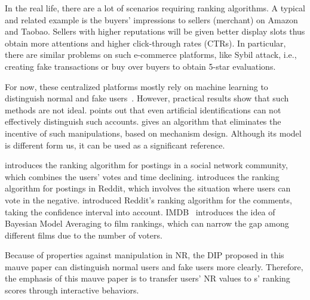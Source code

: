 In the real life, there are a lot of scenarios requiring ranking algorithms. A
typical and related example is the buyers' impressions to sellers (merchant) on
Amazon and Taobao. Sellers with higher reputations will be given better display
slots thus obtain more attentions and higher click-through rates (CTRs). In
particular, there are similar problems on such e-commerce platforms, like Sybil attack, i.e., creating fake transactions or buy over buyers to obtain 5-star evaluations.

For now, these centralized platforms mostly rely on machine learning to
distinguish normal and fake
users~\cite{mukherjee2013spotting,jindal2008opinion,yoo2009comparison}.
However, practical results show that such methods are not ideal.
\cite{ott2011finding} points out that even artificial identifications can not effectively distinguish such accounts.  \cite{cai2016mechanism} gives an
algorithm that eliminates the incentive of such manipulations, based on
mechanism design. Although its model is different form us, it can be used as a significant reference.

\cite{salihefendic2010hacker} introduces the ranking algorithm for postings in
a social network community, which combines the users' votes and time declining.
\cite{salihefendic2010reddit} introduces the ranking algorithm for postings in Reddit, which involves the situation where users can vote in the negative.
\cite{miller2009how} introduced Reddit's ranking algorithm for the comments, taking the confidence interval into account.
IMDB~\cite{IMDB} introduces the idea of Bayesian Model Averaging to film
rankings, which can narrow the gap among different films due to the number of voters.

Because of properties against manipulation in NR, the DIP proposed in this mauve paper can distinguish normal users and fake users more clearly. Therefore, the emphasis of this mauve paper is to transfer users' NR values to {\dapp}s' ranking scores through interactive behaviors.
